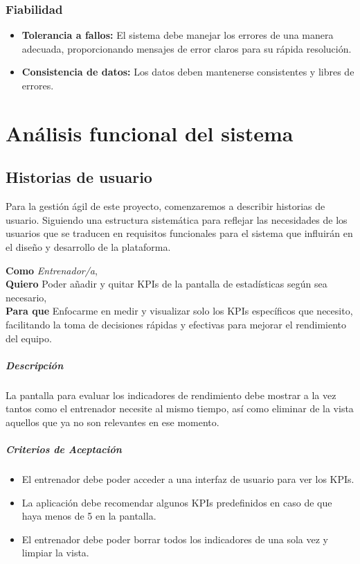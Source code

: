\subsubsection{Fiabilidad}
\begin{itemize}
    \item \textbf{Tolerancia a fallos:} El sistema debe manejar los errores de una manera adecuada, proporcionando mensajes de error claros para su rápida resolución.
    
    \item \textbf{Consistencia de datos:} Los datos deben mantenerse consistentes y libres de errores.
    
\end{itemize}

\section{Análisis funcional del sistema}
\subsection{Historias de usuario}

Para la gestión ágil de este proyecto, comenzaremos a describir historias de usuario. Siguiendo una estructura sistemática para reflejar las necesidades de los usuarios que se traducen en requisitos funcionales para el sistema que influirán en el diseño y desarrollo de la plataforma.

\begin{tcolorbox}[title= Añadir KPIs a la pantalla de estadísticas]
\textbf{Como} \textit{Entrenador/a},\\
\textbf{Quiero} Poder añadir y quitar KPIs de la pantalla de estadísticas según sea necesario,\\
\textbf{Para que} Enfocarme en medir y visualizar solo los KPIs específicos que necesito, facilitando la toma de decisiones rápidas y efectivas para mejorar el rendimiento del equipo.
\end{tcolorbox}

\subparagraph{Descripción}
La pantalla para evaluar los indicadores de rendimiento debe mostrar a la vez tantos como el entrenador necesite al mismo tiempo, así como eliminar de la vista aquellos que ya no son relevantes en ese momento.

\subparagraph{Criterios de Aceptación}
\begin{itemize}
    \item El entrenador debe poder acceder a una interfaz de usuario para ver los KPIs.
    \item La aplicación debe recomendar algunos KPIs predefinidos en caso de que haya menos de 5 en la pantalla.
    \item El entrenador debe poder borrar todos los indicadores de una sola vez y limpiar la vista.
\end{itemize}

